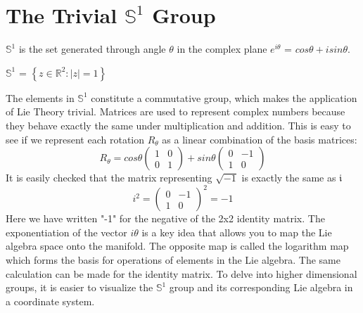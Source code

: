 \documentclass{article}
\begin{document}
\section{The Trivial $\mathbb{S}^1$ Group}
$\mathbb{S}^1$ is the set generated through angle $\theta$ in the complex plane $e^{i\theta}$ = $cos\theta + isin\theta$. \begin{center}$\mathbb{S}^1$ = $\left\{ z \in \mathbb{R}^2 : |z| = 1 \right\}$ \end{center}
The elements in $\mathbb{S}^1$ constitute a commutative group, which makes the application of Lie Theory trivial. Matrices are used to represent complex numbers because they behave exactly the same under multiplication and addition. This is easy to see if we represent each rotation $R_{\theta}$ as a linear combination of the basis matrices:\[
R_{\theta} = cos{\theta}\begin{pmatrix}1 & 0 \\0 & 1\end{pmatrix}
+ sin{\theta}\begin{pmatrix}0 & -1\\1 & 0\end{pmatrix}
\]
It is easily checked that the matrix representing $\sqrt{-1}$ is exactly the same as $\mathfrak{i}$
\[
i^2 = \begin{pmatrix}0 & -1\\1 & 0\end{pmatrix}^2 = -1
\]
Here we have written "-1" for the negative of the 2x2 identity matrix.
    The exponentiation of the vector $i\theta$ is a key idea that allows you to map the Lie algebra space onto the manifold. The opposite map is called the logarithm map which forms the basis for operations of elements in the Lie algebra.
The same calculation can be made for the identity matrix.
To delve into higher dimensional groups, it is easier to visualize the $\mathbb{S}^1$ group and its corresponding Lie algebra in a coordinate system. 
\begin{center}
\end{center}
\end{document}
